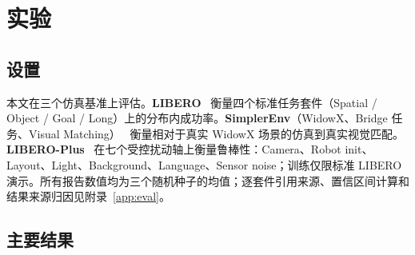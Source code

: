 \documentclass{article}
\begin{document}
\section{实验}

\subsection{设置}

本文在三个仿真基准上评估。\textbf{LIBERO}~\citep{libero} 衡量四个标准任务套件（Spatial / Object / Goal / Long）上的分布内成功率。\textbf{SimplerEnv}（WidowX、Bridge 任务、Visual Matching）~\citep{simplerenv} 衡量相对于真实 WidowX 场景的仿真到真实视觉匹配。\textbf{LIBERO-Plus}~\citep{liberoplus} 在七个受控扰动轴上衡量鲁棒性：Camera、Robot init、Layout、Light、Background、Language、Sensor noise；训练仅限标准 LIBERO 演示。所有报告数值均为三个随机种子的均值；逐套件引用来源、置信区间计算和结果来源归因见附录~\ref{app:eval}。

\subsection{主要结果}
\end{document}
